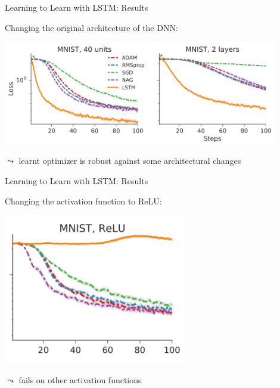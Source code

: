 \begin{frame}[c]{Learning to Learn with LSTM: Results }

Changing the original architecture of the DNN:
\smallskip

\centering
\includegraphics[width=0.9\textwidth]{images/l2l_mnist_okchange}

$\leadsto$ learnt optimizer is robust against some architectural changes

\end{frame}
\begin{frame}[c]{Learning to Learn with LSTM: Results\newline {}}

Changing the activation function to ReLU:
\smallskip

\centering
\includegraphics[width=0.6\textwidth]{images/l2l_mnist_relu}

$\leadsto$ fails on other activation functions

\end{frame}
